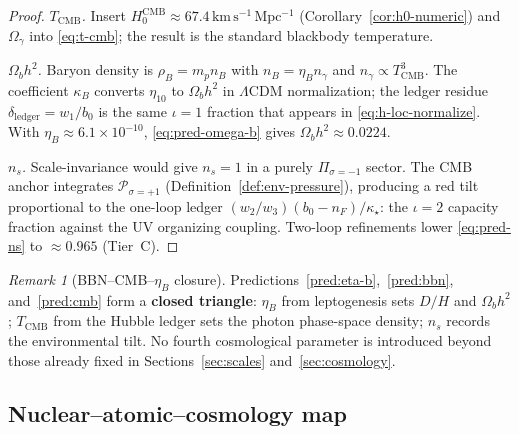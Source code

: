 \documentclass[aps,prd,onecolumn,amsmath,amssymb,nofootinbib,11pt]{revtex4-2}
\numberwithin{equation}{section}
\theoremstyle{plain}
\theoremstyle{definition}
\theoremstyle{remark}
\newtheorem{remark}[theorem]{Remark}
\begin{document}
\begin{proof}
\emph{$T_{\mathrm{CMB}}$.}
Insert $H_0^{\mathrm{CMB}}\approx 67.4\,\mathrm{km\,s^{-1}\,Mpc^{-1}}$
(Corollary~\ref{cor:h0-numeric}) and $\Omega_\gamma$ into
\eqref{eq:t-cmb}; the result is the standard blackbody temperature.

\emph{$\Omega_b h^2$.}
Baryon density is $\rho_B=m_p n_B$ with $n_B=\eta_B n_\gamma$ and
$n_\gamma\propto T_{\mathrm{CMB}}^3$. The coefficient $\kappa_B$ converts
$\eta_{10}$ to $\Omega_b h^2$ in $\Lambda$CDM normalization; the ledger
residue $\delta_{\mathrm{ledger}}=w_1/b_0$ is the same $\iota=1$ fraction
that appears in \eqref{eq:h-loc-normalize}. With $\eta_B\approx 6.1\times
10^{-10}$, \eqref{eq:pred-omega-b} gives $\Omega_b h^2\approx 0.0224$.

\emph{$n_s$.}
Scale-invariance would give $n_s=1$ in a purely $\Pi_{\sigma=-1}$ sector.
The CMB anchor integrates $\mathcal{P}_{\sigma=+1}$ (Definition~\ref{def:env-pressure}),
producing a red tilt proportional to the one-loop ledger
$(w_2/w_3)(b_0-n_F)/\kappa_\star$: the $\iota=2$ capacity fraction against
the UV organizing coupling. Two-loop refinements lower \eqref{eq:pred-ns} to
$\approx 0.965$ (Tier~C).
\end{proof}

\begin{remark}[BBN--CMB--$\eta_B$ closure]
Predictions~\ref{pred:eta-b},~\ref{pred:bbn}, and~\ref{pred:cmb} form a
\textbf{closed triangle}: $\eta_B$ from leptogenesis sets $D/H$ and
$\Omega_b h^2$; $T_{\mathrm{CMB}}$ from the Hubble ledger sets the photon
phase-space density; $n_s$ records the environmental tilt. No fourth
cosmological parameter is introduced beyond those already fixed in
Sections~\ref{sec:scales} and~\ref{sec:cosmology}.
\end{remark}

\subsection{Nuclear--atomic--cosmology map}
\label{sec:nuclear:table}
\end{document}
